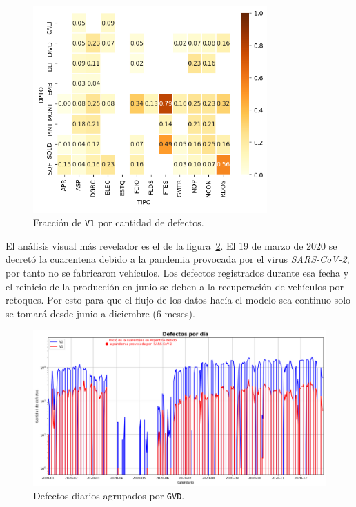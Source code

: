 \documentclass[a4paper,12pt]{article}
\begin{document}
		\begin{figure}[H]
			\begin{center}
				\includegraphics[width=0.8\textwidth]{tesis_58.png}
				\caption{Fracción de \texttt{V1} por cantidad de defectos.}
				\label{fig:heatmapfractionv1}
			\end{center}
		\end{figure}
				
		El análisis visual más revelador es el de la figura~\ref{fig:defectsperday}. El 19 de marzo de 2020 se decretó la cuarentena debido a la pandemia provocada por el virus \textit{SARS-CoV-2}, por tanto no se fabricaron vehículos. Los defectos registrados durante esa fecha y el reinicio de la producción en junio se deben a la recuperación de vehículos por retoques. Por esto para que el flujo de los datos hacía el modelo sea continuo solo se tomará desde junio a diciembre (6 meses).
				
		\begin{figure}[H]
			\begin{center}
				\includegraphics[width=1\textwidth]{tesis_64.png}
				\caption{Defectos diarios agrupados por \texttt{GVD}.}
				\label{fig:defectsperday}
			\end{center}
		\end{figure}
				
\end{document}
